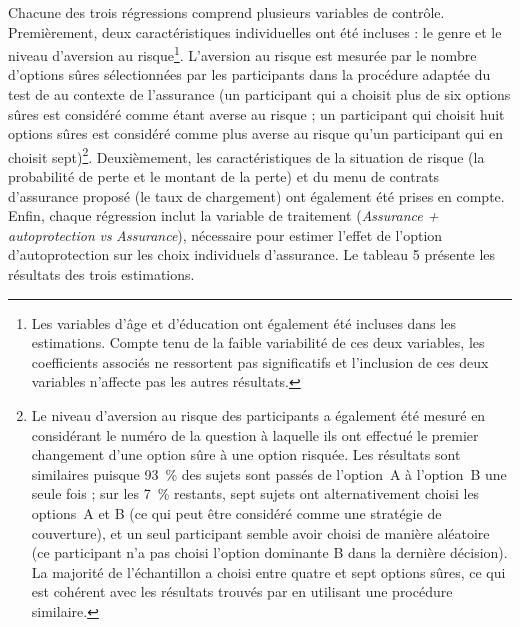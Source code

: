 \begin{Article}
\begin{refsection}[Mouminoux]
Chacune des trois régressions comprend plusieurs variables de contrôle. Premièrement, deux caractéristiques individuelles ont été incluses : le genre et le niveau d'aversion au risque\footnote{Les variables d'âge et d'éducation ont également été incluses dans les estimations. Compte tenu de la faible variabilité de ces deux variables, les coefficients associés ne ressortent pas significatifs et l'inclusion de ces deux variables n'affecte pas les autres résultats.}. L'aversion au risque est mesurée par le nombre d'options sûres sélectionnées par les participants dans la procédure adaptée du test de \textcite{hl02} au contexte de l'assurance (un participant qui a choisit plus de six options sûres est considéré comme étant averse au risque ; un participant qui choisit huit options sûres est considéré comme plus averse au risque qu'un participant qui en choisit sept)\footnote{Le niveau d'aversion au risque des participants a également été mesuré en considérant le numéro de la question à laquelle ils ont effectué le premier changement d'une option sûre à une option risquée. Les résultats sont similaires puisque 93~\% des sujets sont passés de l'option~A à l'option~B une seule fois ; sur les 7~\% restants, sept sujets ont alternativement choisi les options~A et B (ce qui peut être considéré comme une stratégie de couverture), et un seul participant semble avoir choisi de manière aléatoire (ce participant n'a pas choisi l'option dominante B dans la dernière décision). La majorité de l'échantillon a choisi entre quatre et sept options sûres, ce qui est cohérent avec les résultats trouvés par \textcite{cpm17} en utilisant une procédure similaire.}. Deuxièmement, les caractéristiques de la situation de risque (la probabilité de perte et le montant de la perte) et du menu de contrats d'assurance proposé (le taux de chargement) ont également été prises en compte. Enfin, chaque régression inclut la variable de traitement (\textit{Assurance + autoprotection} \emph{vs} \textit{Assurance}), nécessaire pour estimer l'effet de l'option d'autoprotection sur les choix individuels d'assurance. Le tableau 5 présente les résultats des trois estimations.



\end{refsection}
\end{Article}

